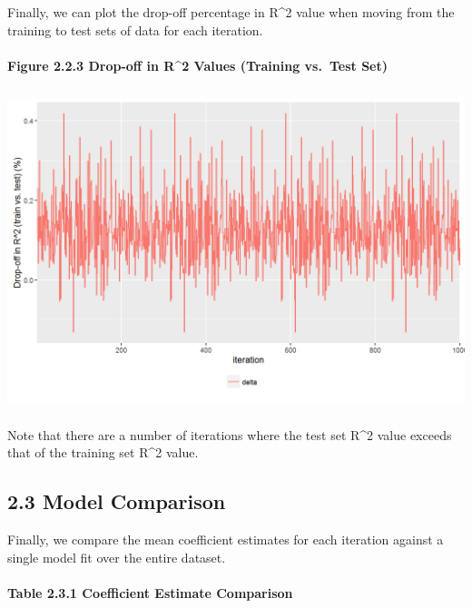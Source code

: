 \documentclass[]{article}
\let\oldparagraph\paragraph
\renewcommand{\paragraph}[1]{\oldparagraph{#1}\mbox{}}
\begin{document}
Finally, we can plot the drop-off percentage in R\^{}2 value when moving
from the training to test sets of data for each iteration.

\paragraph{Figure 2.2.3 Drop-off in R\^{}2 Values (Training vs.~Test
Set)}\label{figure-2.2.3-drop-off-in-r2-values-training-vs.test-set}

\includegraphics[height=3.64583in]{images/dropoff.png}

Note that there are a number of iterations where the test set R\^{}2
value exceeds that of the training set R\^{}2 value.

\subsection{2.3 Model Comparison}\label{model-comparison}

Finally, we compare the mean coefficient estimates for each iteration
against a single model fit over the entire dataset.

\paragraph{Table 2.3.1 Coefficient Estimate
Comparison}\label{table-2.3.1-coefficient-estimate-comparison}
\end{document}
